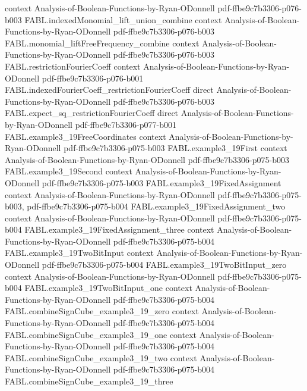 \begin{theorem}
  {context}
  {Analysis-of-Boolean-Functions-by-Ryan-ODonnell}
  {pdf-ffbe9c7b3306-p076-b003}
\proofstep
  {FABL.indexedMonomial_lift_union_combine}
  {context}
  {Analysis-of-Boolean-Functions-by-Ryan-ODonnell}
  {pdf-ffbe9c7b3306-p076-b003}
\proofstep
  {FABL.monomial_liftFreeFrequency_combine}
  {context}
  {Analysis-of-Boolean-Functions-by-Ryan-ODonnell}
  {pdf-ffbe9c7b3306-p076-b003}
\proofstep
  {FABL.restrictionFourierCoeff}
  {context}
  {Analysis-of-Boolean-Functions-by-Ryan-ODonnell}
  {pdf-ffbe9c7b3306-p076-b001}
\proofstep
  {FABL.indexedFourierCoeff_restrictionFourierCoeff}
  {direct}
  {Analysis-of-Boolean-Functions-by-Ryan-ODonnell}
  {pdf-ffbe9c7b3306-p076-b003}
\proofstep
  {FABL.expect_sq_restrictionFourierCoeff}
  {direct}
  {Analysis-of-Boolean-Functions-by-Ryan-ODonnell}
  {pdf-ffbe9c7b3306-p077-b001}
\proofstep
  {FABL.example3_19FreeCoordinates}
  {context}
  {Analysis-of-Boolean-Functions-by-Ryan-ODonnell}
  {pdf-ffbe9c7b3306-p075-b003}
\proofstep
  {FABL.example3_19First}
  {context}
  {Analysis-of-Boolean-Functions-by-Ryan-ODonnell}
  {pdf-ffbe9c7b3306-p075-b003}
\proofstep
  {FABL.example3_19Second}
  {context}
  {Analysis-of-Boolean-Functions-by-Ryan-ODonnell}
  {pdf-ffbe9c7b3306-p075-b003}
\proofstep
  {FABL.example3_19FixedAssignment}
  {context}
  {Analysis-of-Boolean-Functions-by-Ryan-ODonnell}
  {pdf-ffbe9c7b3306-p075-b003,
    pdf-ffbe9c7b3306-p075-b004}
\proofstep
  {FABL.example3_19FixedAssignment_two}
  {context}
  {Analysis-of-Boolean-Functions-by-Ryan-ODonnell}
  {pdf-ffbe9c7b3306-p075-b004}
\proofstep
  {FABL.example3_19FixedAssignment_three}
  {context}
  {Analysis-of-Boolean-Functions-by-Ryan-ODonnell}
  {pdf-ffbe9c7b3306-p075-b004}
\proofstep
  {FABL.example3_19TwoBitInput}
  {context}
  {Analysis-of-Boolean-Functions-by-Ryan-ODonnell}
  {pdf-ffbe9c7b3306-p075-b004}
\proofstep
  {FABL.example3_19TwoBitInput_zero}
  {context}
  {Analysis-of-Boolean-Functions-by-Ryan-ODonnell}
  {pdf-ffbe9c7b3306-p075-b004}
\proofstep
  {FABL.example3_19TwoBitInput_one}
  {context}
  {Analysis-of-Boolean-Functions-by-Ryan-ODonnell}
  {pdf-ffbe9c7b3306-p075-b004}
\proofstep
  {FABL.combineSignCube_example3_19_zero}
  {context}
  {Analysis-of-Boolean-Functions-by-Ryan-ODonnell}
  {pdf-ffbe9c7b3306-p075-b004}
\proofstep
  {FABL.combineSignCube_example3_19_one}
  {context}
  {Analysis-of-Boolean-Functions-by-Ryan-ODonnell}
  {pdf-ffbe9c7b3306-p075-b004}
\proofstep
  {FABL.combineSignCube_example3_19_two}
  {context}
  {Analysis-of-Boolean-Functions-by-Ryan-ODonnell}
  {pdf-ffbe9c7b3306-p075-b004}
\proofstep
  {FABL.combineSignCube_example3_19_three}

\end{theorem}
